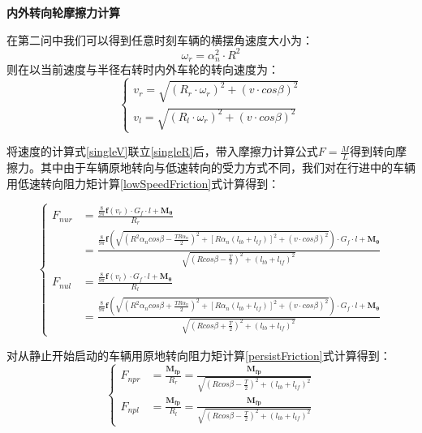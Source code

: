 \documentclass[withoutpreface,bwprint]{cumcmthesis} %
\begin{document}
\textbf{内外转向轮摩擦力计算}

在第二问中我们可以得到任意时刻车辆的横摆角速度大小为：
\begin{equation}
    \omega_r=\alpha_n^2 \cdot R^2
\end{equation}
则在以当前速度与半径右转时内外车轮的转向速度为：
\begin{equation}
\label{singleV}
    \left\{
\begin{aligned}
v_r=\sqrt{(R_r \cdot \omega_r)^2+(v \cdot cos \beta)^2}\\
v_l=\sqrt{(R_l \cdot \omega_r)^2+(v \cdot cos \beta)^2}
\end{aligned}
\right.
\end{equation}

将速度的计算式\eqref{singleV}联立\eqref{singleR}后，带入摩擦力计算公式$F=\frac{M}{L}$得到转向摩擦力。其中由于车辆原地转向与低速转向的受力方式不同，我们对在行进中的车辆用低速转向阻力矩计算\eqref{lowSpeedFriction}式计算得到：

\begin{equation}
\left\{
    \begin{aligned}
    F_{nur} &= \frac{\frac{8}{9\pi} \mathbf{f}(v_r)\cdot G_f \cdot l+ \mathbf{M_\theta}}{R_r}\\
    &=\frac{\frac{8}{9\pi}\mathbf{f}(\sqrt{(R^2 \alpha_n cos\beta-\frac{TR\alpha_n}{2})^2+[R\alpha_n(l_{tb}+l_{tf})]^2+(v \cdot cos \beta)^2} )\cdot G_f \cdot l+ \mathbf{M_\theta}}{\sqrt{(Rcos\beta-\frac{T}{2})^2+(l_{tb}+l_{tf})^2}}\\
    F_{nul} &= \frac{\frac{8}{9\pi} \mathbf{f}(v_l)\cdot G_f \cdot l+ \mathbf{M_\theta}}{R_l}\\
    &=\frac{\frac{8}{9\pi}\mathbf{f}(\sqrt{(R^2 \alpha_n cos\beta+\frac{TR\alpha_n}{2})^2+[R\alpha_n(l_{tb}+l_{tf})]^2+(v \cdot cos \beta)^2} )\cdot G_f \cdot l+ \mathbf{M_\theta}}{\sqrt{(Rcos\beta+\frac{T}{2})^2+(l_{tb}+l_{tf})^2}}
\end{aligned}
\right.
\end{equation}

对从静止开始启动的车辆用原地转向阻力矩计算\eqref{persistFriction}式计算得到：
\begin{equation}
\left\{
    \begin{aligned}
    F_{npr} &= \frac{\mathbf{M_{fp}}}{R_r} =\frac{\mathbf{M_{fp}}}{\sqrt{(Rcos\beta-\frac{T}{2})^2+(l_{tb}+l_{tf})^2}}\\
    F_{npl} &= \frac{\mathbf{M_{fp}}}{R_l} =\frac{\mathbf{M_{fp}}}{\sqrt{(Rcos\beta-\frac{T}{2})^2+(l_{tb}+l_{tf})^2}}
\end{aligned}
\right.
\end{equation}
\end{document}

